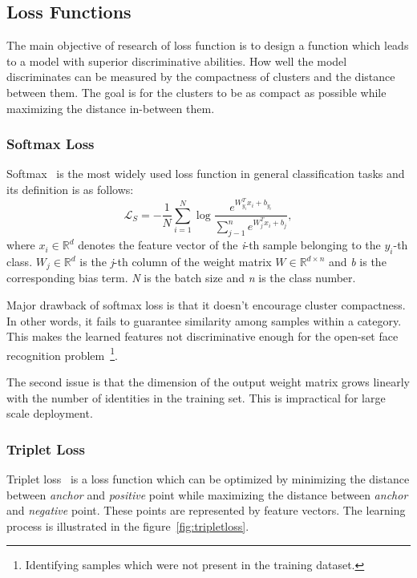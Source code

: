\subsection{Loss Functions}\label{subsec:loss-functions}
The main objective of research of loss function is to design a function which leads to a model with superior
discriminative abilities.
How well the model discriminates can be measured by the compactness of clusters and the distance between them.
The goal is for the clusters to be as compact as possible while maximizing the distance in-between them.

\subsubsection{Softmax Loss}\label{subsubsec:softmax-loss}
Softmax~\cite{ArcFace} is the most widely used loss function in general classification tasks and its definition is as
follows:
\begin{equation}
    \label{eq:softmax}
    \mathcal{L}_S = -\frac{1}{N} \sum_{i=1}^{N} \log \frac{e^{W^T_{y_i} x_{i} + b_{y_i}}}
    {\sum_{j-1}^{n} e^{W^T_{j} x_{i} + b_{j}}},
\end{equation}
where $x_i \in \mathbb{R}^{d}$ denotes the feature vector of the \textit{i}-th sample belonging to the $y_i$-th class.
$W_j \in \mathbb{R}^{d}$ is the \textit{j}-th column of the weight matrix $W \in \mathbb{R}^{d \times n}$ and \textit{b}
is the corresponding bias term.
\textit{N} is the batch size and \textit{n} is the class number.

Major drawback of softmax loss is that it doesn't encourage cluster compactness.
In other words, it fails to guarantee similarity among samples within a category.
This makes the learned features not discriminative enough for the open-set face recognition
problem~\footnote{Identifying samples which were not present in the training dataset.}.

The second issue is that the dimension of the output weight matrix grows linearly with the number of identities in the
training set.
This is impractical for large scale deployment.

\subsubsection{Triplet Loss}\label{subsubsec:triplet-loss}
Triplet loss~\cite{TripletLoss} is a loss function which can be optimized by minimizing the distance between
\textit{anchor} and \textit{positive} point while maximizing the distance between \textit{anchor} and \textit{negative}
point.
These points are represented by feature vectors.
The learning process is illustrated in the figure~\ref{fig:tripletloss}.


